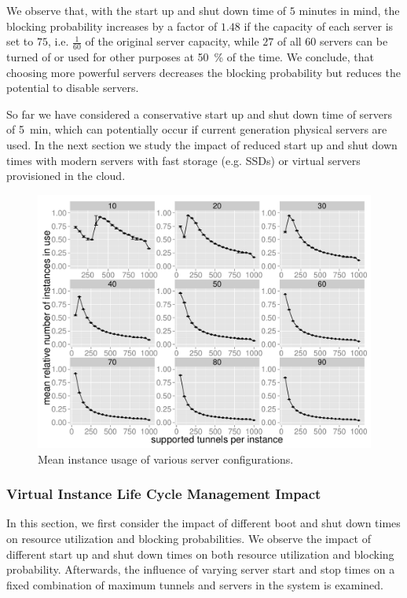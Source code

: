 We observe that, with the start up and shut down time of $5$ minutes in mind, the blocking probability increases by a factor of $1.48$ if the capacity of each server is set to $75$, i.e. $\frac{1}{60}$ of the original server capacity, while $27$ of all $60$ servers can be turned of or used for other purposes at \SI{50}{\percent} of the time. We conclude, that choosing more powerful servers decreases the blocking probability but reduces the potential to disable servers.

So far we have considered a conservative start up and shut down time of servers of \SI{5}{\minute}, which can potentially occur if current generation physical servers are used.
In the next section we study the impact of reduced start up and shut down times with modern servers with fast storage (e.g. \glspl{SSD}) or virtual servers provisioned in the cloud.




\begin{figure}[htb]
  \centering
  \includegraphics[width=1.0\textwidth]{images/instanceuse-mean.pdf}
  \caption{Mean instance usage of various server configurations.}
 \label{c4:fig:res-instance-usage-mean}
\end{figure}


\subsubsection{Virtual Instance Life Cycle Management Impact}

In this section, we first consider the impact of different boot and shut down times on resource utilization and blocking probabilities. We observe the impact of different start up and shut down times on both resource utilization and blocking probability. Afterwards, the influence of varying server start and stop times on a fixed combination of maximum tunnels and servers in the system is examined.

